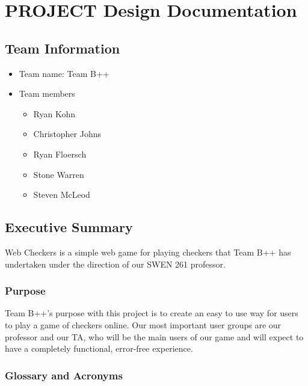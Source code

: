 \documentclass[]{article}
\date{}
\providecommand{\tightlist}{%
  \setlength{\itemsep}{0pt}\setlength{\parskip}{0pt}}
\begin{document}
\hypertarget{project-design-documentation}{%
\section{PROJECT Design
Documentation}\label{project-design-documentation}}

\hypertarget{team-information}{%
\subsection{Team Information}\label{team-information}}

\begin{itemize}
\tightlist
\item
  Team name: Team B++
\item
  Team members

  \begin{itemize}
  \tightlist
  \item
    Ryan Kohn
  \item
    Christopher Johns
  \item
    Ryan Floersch
  \item
    Stone Warren
  \item
    Steven McLeod
  \end{itemize}
\end{itemize}

\hypertarget{executive-summary}{%
\subsection{Executive Summary}\label{executive-summary}}

Web Checkers is a simple web game for playing checkers that Team B++ has
undertaken under the direction of our SWEN 261 professor.

\hypertarget{purpose}{%
\subsubsection{Purpose}\label{purpose}}

Team B++'s purpose with this project is to create an easy to use way for
users to play a game of checkers online. Our most important user groups
are our professor and our TA, who will be the main users of our game and
will expect to have a completely functional, error-free experience.

\hypertarget{glossary-and-acronyms}{%
\subsubsection{Glossary and Acronyms}\label{glossary-and-acronyms}}
\end{document}

